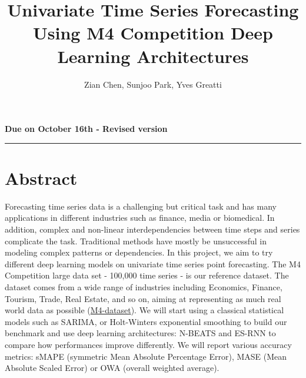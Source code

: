 \documentclass{article}
\title{Univariate Time Series Forecasting Using  M4 Competition Deep Learning Architectures}
\author{Zian Chen, Sunjoo Park, Yves Greatti}
\date{}
\begin{document}
\maketitle
\textbf{Due on October 16th - Revised version}

\noindent\rule{\textwidth}{0.4pt}


\section*{Abstract}
Forecasting time series data is a challenging but critical task and has many applications in different industries such as finance, media or biomedical.
In addition, complex and non-linear interdependencies between time steps and series complicate the task.
Traditional methods have mostly be unsuccessful in modeling complex patterns or dependencies. 
In this project, we aim to try different deep learning models on univariate time series point forecasting.
The M4 Competition large data set - 100,000 time series - is our reference dataset. The dataset comes from a wide range of industries including Economics, Finance, Tourism, Trade, Real Estate, and so on, aiming at representing as much real world data as possible (\hyperlink{https://github.com/M4Competition/M4-methods/tree/master/Dataset} {M4-dataset}).
We will start using a classical statistical models such as SARIMA, or Holt-Winters exponential smoothing to build our benchmark and use deep learning architectures: N-BEATS \cite{N-BEATS} and ES-RNN \cite{ES-RNN} to compare how performances improve differently. We will report various accuracy metrics:
sMAPE (symmetric Mean Absolute Percentage Error), MASE  (Mean Absolute Scaled Error)  or OWA (overall weighted average).
\end{document}
